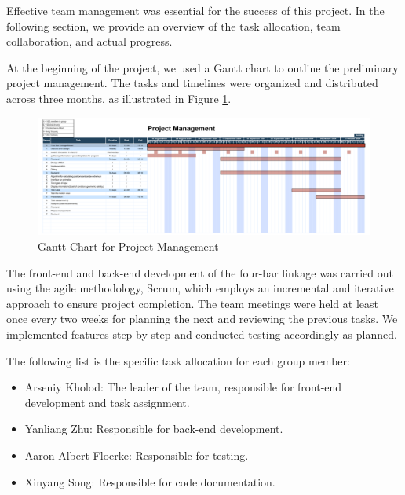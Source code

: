 \documentclass{article}
\begin{document}
Effective team management was essential for the success of this project. In the following section, we provide an overview of the task allocation, team collaboration, and actual progress.

At the beginning of the project, we used a Gantt chart to outline the preliminary project management. The tasks and timelines were organized and distributed across three months, as illustrated in Figure \ref{fig:project_management_gantt_chart}.

\begin{figure}[h]
	\centering
	\includegraphics[width=\textwidth]{./figures/project_management_gantt_chart.pdf}
	\caption{Gantt Chart for Project Management}
	\label{fig:project_management_gantt_chart}
\end{figure}

The front-end and back-end development of the four-bar linkage was carried out using the agile methodology, Scrum, which employs an incremental and iterative approach to ensure project completion. The team meetings were held at least once every two weeks for planning the next and reviewing the previous tasks. We implemented features step by step and conducted testing accordingly as planned.

The following list is the specific task allocation for each group member:

\begin{itemize}
    \item Arseniy Kholod: The leader of the team, responsible for front-end development and task assignment.
    \item Yanliang Zhu: Responsible for back-end development.
    \item Aaron Albert Floerke: Responsible for testing.
    \item Xinyang Song: Responsible for code documentation.
\end{itemize}
\end{document}
